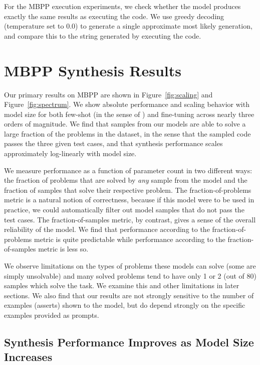 For the MBPP execution experiments, we check whether the model produces exactly the same results as executing the code. We use greedy decoding (temperature set to 0.0) to generate a single approximate most likely generation, and compare this to the string generated by executing the code. 

\section{MBPP Synthesis Results}
\label{section:synth_results}

Our primary results on MBPP are shown in Figure~\ref{fig:scaling} and Figure~\ref{fig:spectrum}. We show absolute performance and scaling behavior with model size for both few-shot (in the sense of \cite{GPT3}) and fine-tuning across nearly three orders of magnitude. We find that samples from our models are able to solve a large fraction of the problems in the dataset, in the sense that the sampled code passes the three given test cases, and that synthesis performance scales approximately log-linearly with model size.

We measure performance as a function of parameter count in two different ways: the fraction of problems that are solved by \textit{any} sample from the model and the fraction of samples that solve their respective problem. The fraction-of-problems metric is a natural notion of correctness, because if this model were to be used in practice, we could automatically filter out model samples that do not pass the test cases. The fraction-of-samples metric, by contrast, gives a sense of the overall reliability of the model. We find that performance according to the fraction-of-problems metric is quite predictable while performance according to the fraction-of-samples metric is less so.

We observe limitations on the types of problems these models can solve (some are simply unsolvable) and many solved problems tend to have only 1 or 2 (out of 80) samples which solve the task. We examine this and other limitations in later sections. We also find that our results are not strongly sensitive to the number of examples (asserts) shown to the model, but do depend strongly on the specific examples provided as prompts.

\subsection{Synthesis Performance Improves as Model Size Increases}
\label{sec:scaling}

